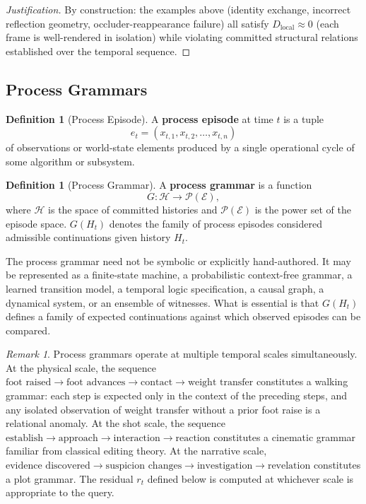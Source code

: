 \documentclass[11pt,a4paper]{article}
\theoremstyle{plain}
\theoremstyle{definition}
\newtheorem{definition}[theorem]{Definition}
\theoremstyle{remark}
\newtheorem{remark}[theorem]{Remark}
\begin{document}
\begin{proof}[Justification]
By construction: the examples above (identity exchange, incorrect reflection geometry, occluder-reappearance failure) all satisfy $D_{\mathrm{local}} \approx 0$ (each frame is well-rendered in isolation) while violating committed structural relations established over the temporal sequence.
\end{proof}

\subsection{Process Grammars}

\begin{definition}[Process Episode]
A \textbf{process episode} at time $t$ is a tuple
\[
e_t = (x_{t,1}, x_{t,2}, \ldots, x_{t,n})
\]
of observations or world-state elements produced by a single operational cycle of some algorithm or subsystem.
\end{definition}

\begin{definition}[Process Grammar]
A \textbf{process grammar} is a function
\[
G : \mathcal{H} \to \mathcal{P}(\mathcal{E}),
\]
where $\mathcal{H}$ is the space of committed histories and $\mathcal{P}(\mathcal{E})$ is the power set of the episode space. $G(H_t)$ denotes the family of process episodes considered admissible continuations given history $H_t$.
\end{definition}

The process grammar need not be symbolic or explicitly hand-authored. It may be represented as a finite-state machine, a probabilistic context-free grammar, a learned transition model, a temporal logic specification, a causal graph, a dynamical system, or an ensemble of witnesses. What is essential is that $G(H_t)$ defines a family of expected continuations against which observed episodes can be compared.

\begin{remark}
Process grammars operate at multiple temporal scales simultaneously. At the physical scale, the sequence $\text{foot raised} \to \text{foot advances} \to \text{contact} \to \text{weight transfer}$ constitutes a walking grammar: each step is expected only in the context of the preceding steps, and any isolated observation of weight transfer without a prior foot raise is a relational anomaly. At the shot scale, the sequence $\text{establish} \to \text{approach} \to \text{interaction} \to \text{reaction}$ constitutes a cinematic grammar familiar from classical editing theory. At the narrative scale, $\text{evidence discovered} \to \text{suspicion changes} \to \text{investigation} \to \text{revelation}$ constitutes a plot grammar. The residual $r_t$ defined below is computed at whichever scale is appropriate to the query.
\end{remark}
\end{document}
